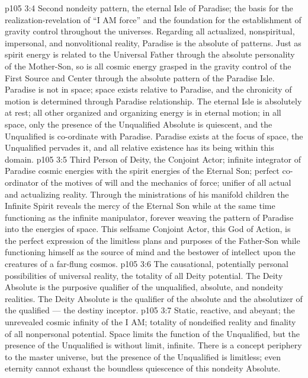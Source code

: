 \vs p105 3:4 \bibnobreakspace {} Second nondeity pattern, the eternal Isle of Paradise; the basis for the realization\hyp{}revelation of “I AM force” and the foundation for the establishment of gravity control throughout the universes. Regarding all actualized, nonspiritual, impersonal, and nonvolitional reality, Paradise is the absolute of patterns. Just as spirit energy is related to the Universal Father through the absolute personality of the Mother\hyp{}Son, so is all cosmic energy grasped in the gravity control of the First Source and Center through the absolute pattern of the Paradise Isle. Paradise is not in space; space exists relative to Paradise, and the chronicity of motion is determined through Paradise relationship. The eternal Isle is absolutely at rest; all other organized and organizing energy is in eternal motion; in all space, only the presence of the Unqualified Absolute is quiescent, and the Unqualified is co\hyp{}ordinate with Paradise. Paradise exists at the focus of space, the Unqualified pervades it, and all relative existence has its being within this domain.
\vs p105 3:5 \pc {}\bibnobreakspace {} Third Person of Deity, the Conjoint Actor; infinite integrator of Paradise cosmic energies with the spirit energies of the Eternal Son; perfect co\hyp{}ordinator of the motives of will and the mechanics of force; unifier of all actual and actualizing reality. Through the ministrations of his manifold children the Infinite Spirit reveals the mercy of the Eternal Son while at the same time functioning as the infinite manipulator, forever weaving the pattern of Paradise into the energies of space. This selfsame Conjoint Actor, this God of Action, is the perfect expression of the limitless plans and purposes of the Father\hyp{}Son while functioning himself as the source of mind and the bestower of intellect upon the creatures of a far\hyp{}flung cosmos.
\vs p105 3:6 \pc {}\bibnobreakspace {} The causational, potentially personal possibilities of universal reality, the totality of all Deity potential. The Deity Absolute is the purposive qualifier of the unqualified, absolute, and nondeity realities. The Deity Absolute is the qualifier of the absolute and the absolutizer of the qualified --- the destiny inceptor.
\vs p105 3:7 \pc {}\bibnobreakspace {} Static, reactive, and abeyant; the unrevealed cosmic infinity of the I AM; totality of nondeified reality and finality of all nonpersonal potential. Space limits the function of the Unqualified, but the presence of the Unqualified is without limit, infinite. There is a concept periphery to the master universe, but the presence of the Unqualified is limitless; even eternity cannot exhaust the boundless quiescence of this nondeity Absolute.
